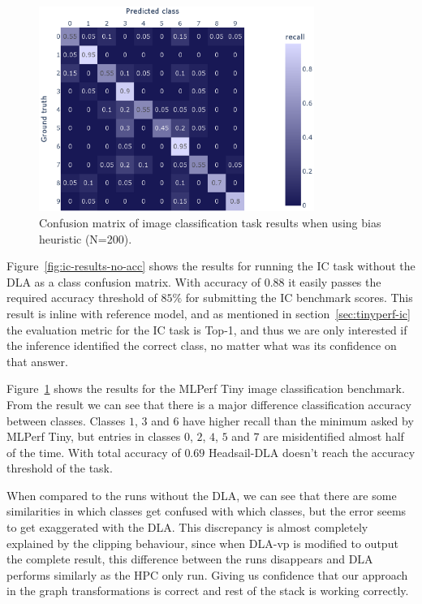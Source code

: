 \documentclass[12pt,a4paper,english
]{tunithesis}
\begin{document}
\begin{figure}[h]
  \centering
  \includegraphics[width=0.8\textwidth]{img/ic_200_abs_heuristic.eps}
  \caption{Confusion matrix of image classification task results when using bias heuristic (N=200).}
  \label{fig:ic-results}
\end{figure}


Figure~\ref{fig:ic-results-no-acc} shows the results for running the IC task without the DLA as a class confusion matrix. With accuracy of $0.88$ it easily passes the
required accuracy threshold of $85\%$ for submitting the IC benchmark scores. This result is inline with reference model, and as mentioned in section~\ref{sec:tinyperf-ic} the evaluation metric for the IC task is Top-1, and thus we are only interested if the inference identified the correct class, no matter what was its confidence on that answer.

Figure~\ref{fig:ic-results} shows the results for the MLPerf Tiny image classification benchmark. From the result we can see that there is a major difference classification accuracy between classes. Classes $1$, $3$ and $6$ have higher recall than the minimum asked by MLPerf Tiny, but entries in classes $0$, $2$, $4$, $5$ and $7$ are misidentified almost half of the time. With total accuracy of $0.69$ Headsail-DLA doesn't reach the accuracy threshold of the task.

When compared to the runs without the DLA, we can see that there are some similarities in which classes get confused with which classes, but the error seems to get exaggerated with the DLA.
This discrepancy is almost completely explained by the clipping behaviour, since when DLA-vp is modified to output the complete result, this difference between the runs disappears and DLA performs similarly as the HPC only run. Giving us confidence that our approach in the graph transformations is correct and rest of the stack is working correctly.
\end{document}
